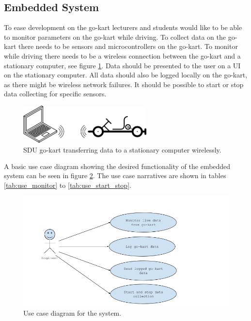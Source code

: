 \subsection{Embedded System}
To ease development on the go-kart lecturers and students would like to be able to monitor parameters on the go-kart while driving.
To collect data on the go-kart there needs to be sensors and microcontrollers on the go-kart.
To monitor while driving there needs to be a wireless connection between the go-kart and a stationary computer, see figure \ref{fig:simple}.
Data should be presented to the user on a UI on the stationary computer.
All data should also be logged locally on the go-kart, as there might be wireless network failures. 
It should be possible to start or stop data collecting for specific sensors.
\begin{figure}[h]
 	\centering
    \includegraphics[width=0.6\textwidth]{graphics/go_kart_network_simple}
    \caption{SDU go-kart transferring data to a stationary computer wirelessly.}
    \label{fig:simple}
\end{figure}

A basic use case diagram showing the desired functionality of the embedded system can be seen in figure \ref{fig:use_cases}.
The use case narratives are shown in tables \ref{tab:use_monitor} to \ref{tab:use_start_stop}.


\begin{figure}[h]
 	\centering
    \includegraphics[width=1\textwidth]{graphics/use_cases.png}
    \caption{Use case diagram for the system.}
    \label{fig:use_cases}
\end{figure}


